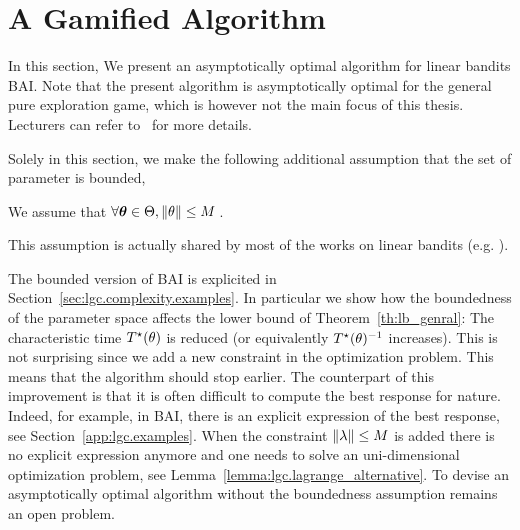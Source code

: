 \section{A Gamified Algorithm}\label{sec:lgc.game}

In this section, We present an asymptotically optimal algorithm for linear bandits BAI. Note that the present algorithm is asymptotically optimal for the general pure exploration game, which is however not the main focus of this thesis. Lecturers can refer to~\cite{degenne2020game} for more details.

Solely in this section, we make the following additional assumption that the set of parameter is bounded,
\begin{assumption}
\begin{leftbar}[assumptionbar]
    We assume that $\forall {\boldsymbol \theta}\in\Theta, \left\lVert\theta\right\rVert\leq M$\,.
\end{leftbar}
\end{assumption}
This assumption is actually shared by most of the works on linear bandits (e.g. \citealt{abbasi-yadkori2011linear, soare2014linear}).

The bounded version of BAI is explicited in Section~\ref{sec:lgc.complexity.examples}. In particular we show how the boundedness of the parameter space affects the lower bound of Theorem~\ref{th:lb_genral}: The characteristic time $T^{\star}(\theta)$ is reduced (or equivalently $T^{\star}(\theta)^{-1}$ increases). This is not surprising since we add a new constraint in the optimization problem. This means that the algorithm should stop earlier. The counterpart of this improvement is that it is often difficult to compute the best response for nature. Indeed, for example, in BAI, there is an explicit expression of the best response, see Section~\ref{app:lgc.examples}. When the constraint $\left\lVert\lambda\right\rVert\leq M$ is added there is no explicit expression anymore and one needs to solve an uni-dimensional optimization problem, see Lemma~\ref{lemma:lgc.lagrange_alternative}. To devise an asymptotically optimal algorithm without the boundedness assumption remains an open problem.


